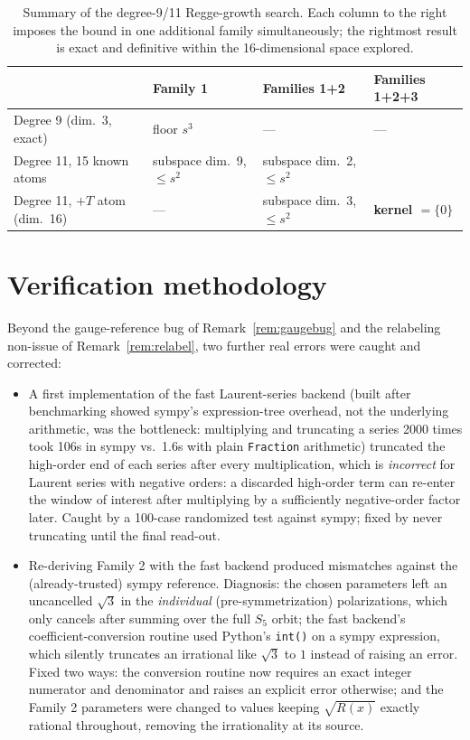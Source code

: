 \documentclass[reqno]{amsart}
\begin{document}
\begin{table}[h]
\centering
\small
\begin{tabular}{@{}p{3.2cm} p{2.6cm} p{2.6cm} p{2.6cm}@{}}
\hline
& Family 1 & Families 1+2 & Families 1+2+3 \\
\hline
Degree 9 (dim.\ 3, exact) & floor $s^3$ & --- & --- \\[2pt]
Degree 11, 15 known atoms & subspace dim.\ 9, $\leq s^2$ & subspace dim.\ 2, $\leq s^2$ & \\[2pt]
Degree 11, $+T$ atom (dim.\ 16) & --- & subspace dim.\ 3, $\leq s^2$ & \textbf{kernel $=\{0\}$} \\
\hline
\end{tabular}
\caption{Summary of the degree-9/11 Regge-growth search. Each column to the right imposes the
bound in one additional family simultaneously; the rightmost result is exact and definitive within
the 16-dimensional space explored.}
\end{table}

\section{Verification methodology}
\label{sec:verification}

Beyond the gauge-reference bug of Remark~\ref{rem:gaugebug} and the relabeling non-issue of
Remark~\ref{rem:relabel}, two further real errors were caught and corrected:

\begin{itemize}
\item A first implementation of the fast Laurent-series backend (built after benchmarking showed
sympy's expression-tree overhead, not the underlying arithmetic, was the bottleneck: multiplying
and truncating a series 2000 times took 106s in sympy vs.\ 1.6s with plain \texttt{Fraction}
arithmetic) truncated the high-order end of each series after every multiplication, which is
\emph{incorrect} for Laurent series with negative orders: a discarded high-order term can re-enter
the window of interest after multiplying by a sufficiently negative-order factor later. Caught by a
100-case randomized test against sympy; fixed by never truncating until the final read-out.
\item Re-deriving Family 2 with the fast backend produced mismatches against the (already-trusted)
sympy reference. Diagnosis: the chosen parameters left an uncancelled $\sqrt3$ in the
\emph{individual} (pre-symmetrization) polarizations, which only cancels after summing over the
full $S_5$ orbit; the fast backend's coefficient-conversion routine used Python's \texttt{int()} on
a sympy expression, which silently truncates an irrational like $\sqrt3$ to $1$ instead of raising
an error. Fixed two ways: the conversion routine now requires an exact integer numerator and
denominator and raises an explicit error otherwise; and the Family 2 parameters were changed to
values keeping $\sqrt{R(x)}$ exactly rational throughout, removing the irrationality at its source.
\end{itemize}
\end{document}
